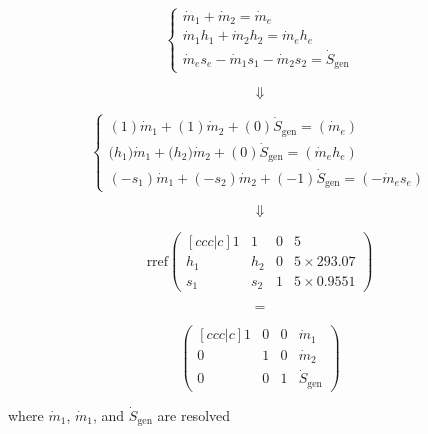 
\makeatletter
\renewcommand*\env@matrix[1][*\c@MaxMatrixCols c]{
    \hskip -\arraycolsep
    \let\@ifnextchar\new@ifnextchar
    \array{#1}}
\makeatother



$$\begin{cases}
    \dot{m}_1 + \dot{m}_2 
        = \dot{m}_e \\
    \dot{m}_1 h_1 + \dot{m}_2 h_2 
        = \dot{m}_e h_e \\
    \dot{m}_e s_e - \dot{m}_1 s_1 - \dot{m}_2 s_2 
        = \dot{S}_{\text{gen}}
\end{cases}$$


$$\Downarrow$$


$$\begin{cases}
    ({1})\dot{m}_1 + ({1})\dot{m}_2 + ({0})\dot{S}_{\text{gen}}
        = ({\dot{m}_e}) \\
    ({h_1)} \dot{m}_1  + ({h_2)} \dot{m}_2 + (0) \dot{S}_{\text{gen}} 
        = ({\dot{m}_e h_e}) \\
    ({-s_1})\dot{m}_1 + ({-s_2})\dot{m}_2 + ({-1})\dot{S}_{\text{gen}}
        = ({-\dot{m}_e s_e})
\end{cases}$$


$$\Downarrow$$


$$ \text{rref}\left( \begin{matrix}[ccc|c]
    1 & 1 & 0 & 5 \\
    h_1 & h_2 & 0 & 5 \times 293.07 \\
    s_1 & s_2 & 1 & 5 \times 0.9551
\end{matrix} \right)$$


$$=$$


$$\left( \begin{matrix}[ccc|c]
    1 & 0 & 0 & \dot{m}_1 \\
    0 & 1 & 0 & \dot{m}_2 \\
    0 & 0 & 1 & \dot{S}_{\text{gen}}
\end{matrix} \right)$$

\begin{center}
    where 
    $\dot{m}_1$, 
    $\dot{m}_1$, 
    and $\dot{S}_{\text{gen}}$
    are resolved
\end{center}